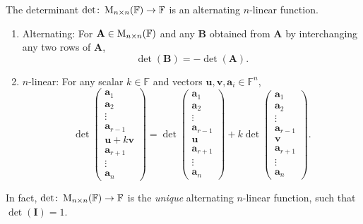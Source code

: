 \begin{theorem}{}{}
    The determinant \(\det\colon\operatorname{M}_{n \times n}(\mathbb{F})\to \mathbb{F}\) is an alternating \(n\)-linear function. 
    \begin{enumerate}[label=(\alph*)]
        \item Alternating: For \(\mathbf{A}\in\operatorname{M}_{n \times n}(\mathbb{F})\) and any \(\mathbf{B}\) obtained from \(\mathbf{A}\) by interchanging any two rows of \(\mathbf{A}\),
        \[\det(\mathbf{B})=-\det(\mathbf{A}).\]
        \item \(n\)-linear: For any scalar \(k \in \mathbb{F}\) and vectors \(\mathbf{u},\mathbf{v},\mathbf{a}_i\in \mathbb{F}^n\),
        \[\det\begin{pmatrix}
            \mathbf{a}_1\\
            \mathbf{a}_2\\
            \vdots\\
            \mathbf{a}_{r-1}\\
            \mathbf{u}+k\mathbf{v}\\
            \mathbf{a}_{r+1}\\
            \vdots\\
            \mathbf{a}_n
        \end{pmatrix}=
        \det\begin{pmatrix}
            \mathbf{a}_1\\
            \mathbf{a}_2\\
            \vdots\\
            \mathbf{a}_{r-1}\\
            \mathbf{u}\\
            \mathbf{a}_{r+1}\\
            \vdots\\
            \mathbf{a}_n
        \end{pmatrix}+
        k\det\begin{pmatrix}
            \mathbf{a}_1\\
            \mathbf{a}_2\\
            \vdots\\
            \mathbf{a}_{r-1}\\
            \mathbf{v}\\
            \mathbf{a}_{r+1}\\
            \vdots\\
            \mathbf{a}_n
        \end{pmatrix}.\]
    \end{enumerate}
    In fact, \(\det\colon\operatorname{M}_{n \times n}(\mathbb{F})\to \mathbb{F}\) is the \emph{unique} alternating \(n\)-linear function, such that \(\det(\mathbf{I})=1\).
\end{theorem}
